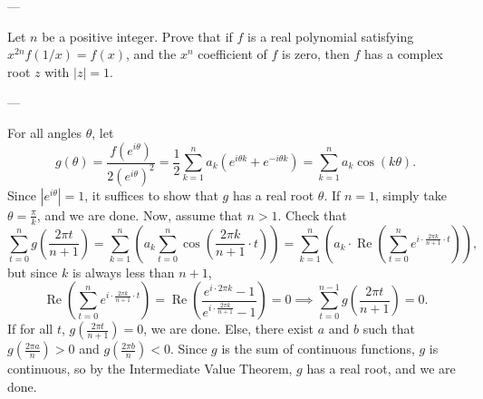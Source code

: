 
---

Let $n$ be a positive integer. Prove that if $f$ is a real polynomial satisfying $x^{2n}f(1/x)=f(x)$, and the $x^n$ coefficient of $f$ is zero, then $f$ has a complex root $z$ with $|z|=1$.

---

For all angles $\theta$, let \[g(\theta)=\frac{f(e^{i\theta})}{2(e^{i\theta})^2}=\frac12\sum_{k=1}^na_k\left(e^{i\theta k}+e^{-i\theta k}\right)=\sum_{k=1}^na_k\cos(k\theta).\]
Since $|e^{i\theta}|=1$, it suffices to show that $g$ has a real root $\theta$. If $n=1$, simply take $\theta=\tfrac\pi k$, and we are done. Now, assume that $n>1$. Check that \[\sum_{t=0}^ng\left(\frac{2\pi t}{n+1}\right)=\sum_{k=1}^n \left(a_k\sum_{t=0}^n\cos\left(\frac{2\pi k}{n+1}\cdot t\right)\right)=\sum_{k=1}^n\left(a_k\cdot\operatorname{Re}\left(\sum_{t=0}^ne^{i\cdot \frac{2\pi k}{n+1}\cdot t}\right)\right),\]
but since $k$ is always less than $n+1$, \[\operatorname{Re}\left(\sum_{t=0}^ne^{i\cdot \frac{2\pi k}{n+1}\cdot t}\right)=\operatorname{Re}\left(\frac{e^{i\cdot 2\pi k}-1}{e^{i\cdot\frac{2\pi k}{n+1}}-1}\right)=0\implies\sum_{t=0}^{n-1}g\left(\frac{2\pi t}{n+1}\right)=0.\]
If for all $t$, $g(\tfrac{2\pi t}{n+1})=0$, we are done. Else, there exist $a$ and $b$ such that $g(\tfrac{2\pi a}n)>0$ and $g(\tfrac{2\pi b}n)<0$. Since $g$ is the sum of continuous functions, $g$ is continuous, so by the Intermediate Value Theorem, $g$ has a real root, and we are done.
